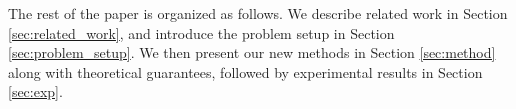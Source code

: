 The rest of the paper is organized as follows. We describe related work in Section \ref{sec:related_work}, 
and introduce the problem setup in Section \ref{sec:problem_setup}.
We then present our new methods in Section \ref{sec:method} along with theoretical guarantees, followed by experimental results in Section \ref{sec:exp}.

 
